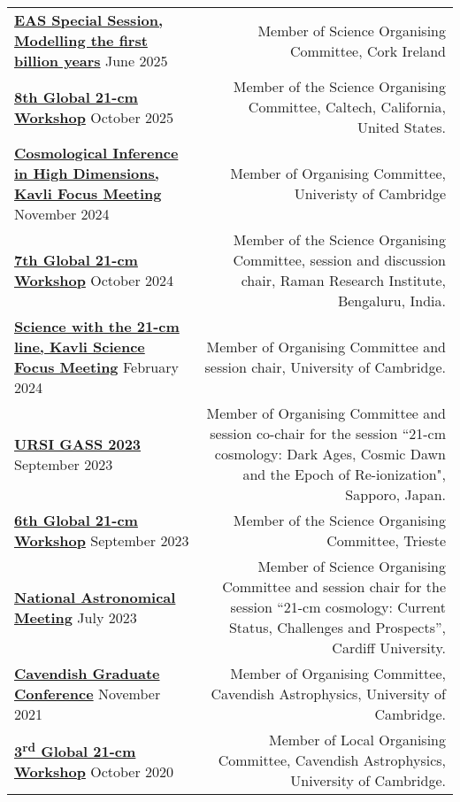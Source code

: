 \documentclass{article}
\begin{document}
\begin{tabular}{l!{\vrule}r}
    \href{https://eas.unige.ch/EAS2025//session.jsp?id=SS22}{\textbf{EAS Special Session, Modelling the first billion years}} June 2025 & Member of Science Organising Committee, Cork Ireland \\
    \href{https://sites.google.com/asu.edu/8g21cmworkshop}{\textbf{8th Global 21-cm Workshop}} October 2025 & Member of the Science Organising Committee, Caltech, California, United States. \\
    \href{https://www.kicc.cam.ac.uk/events/kavli-science-themed-meetings/cosmological-inference-high-dimension}{\textbf{Cosmological Inference in High Dimensions, Kavli Focus Meeting}} November 2024 & Member of Organising Committee, Univeristy of Cambridge \\
    \href{https://sites.google.com/view/global-21-cm-workshop}{\textbf{7th Global 21-cm Workshop}} October 2024 & Member of the Science Organising Committee, session and discussion chair, Raman Research Institute, Bengaluru, India. \\
    \href{https://www.kicc.cam.ac.uk/events/kavli-science-themed-meetings/science-21-cm-hydrogen-line}{\textbf{Science with the 21-cm line, Kavli Science Focus Meeting}} February 2024 & Member of Organising Committee and session chair, University of Cambridge. \\
    \href{https://www.ursi-gass2023.jp}{\textbf{URSI GASS 2023}} September 2023 & Member of Organising Committee and session co-chair for the session ``21-cm cosmology: Dark Ages, Cosmic Dawn and the Epoch of Re-ionization", Sapporo, Japan. \\
    \href{https://global21cmworkshop.org/2023-ifpu/}{\textbf{6th Global 21-cm Workshop}} September 2023 & Member of the Science Organising Committee, Trieste \\
    \href{https://nam2023.org}{\textbf{National Astronomical Meeting}} July 2023 & Member of Science Organising Committee and session chair for the session “21-cm cosmology: Current Status, Challenges and Prospects”, Cardiff University. \\
	\href{http://cavgradcon.soc.srcf.net/index.html}{\textbf{Cavendish Graduate Conference}} November 2021 & Member of Organising Committee, Cavendish Astrophysics, University of Cambridge.\\
	\href{https://sites.google.com/view/third21cmglobalworkshop/home?authuser=0}{\textbf{3\textsuperscript{rd} Global 21-cm Workshop}} October 2020 & Member of Local Organising Committee, Cavendish Astrophysics, University of Cambridge.	
\end{tabular}
\end{document}

